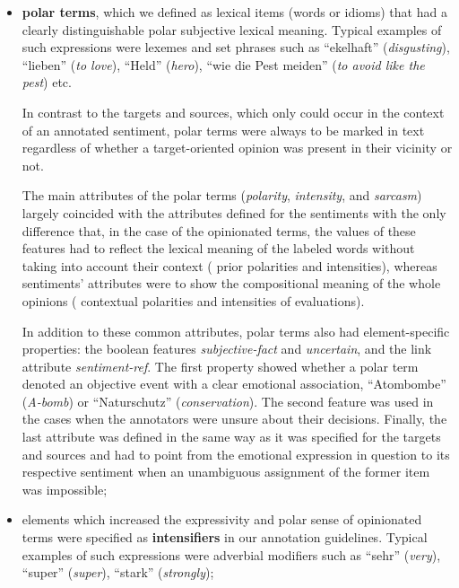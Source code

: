 \begin{itemize}
\item
  \textbf{polar terms}, which we defined as lexical items
  (words or idioms) that had a clearly distinguishable polar
  subjective lexical meaning.  Typical examples of such expressions
  were lexemes and set phrases such as ``ekelhaft''
  (\emph{disgusting}), ``lieben'' (\emph{to love}), ``Held''
  (\emph{hero}), ``wie die Pest meiden'' (\emph{to avoid like the
    pest}) etc.

  In contrast to the targets and sources, which only could occur in
  the context of an annotated sentiment, polar terms were
  always to be marked in text regardless of whether a target-oriented
  opinion was present in their vicinity or not.

  The main attributes of the polar terms (\emph{polarity},
  \emph{intensity}, and \emph{sarcasm}) largely coincided with the
  attributes defined for the sentiments with the only difference that,
  in the case of the opinionated terms, the values of these features
  had to reflect the lexical meaning of the labeled words without
  taking into account their context (\ie{} prior polarities and
  intensities), whereas sentiments' attributes were to show the
  compositional meaning of the whole opinions (\ie{} contextual
  polarities and intensities of evaluations).

  In addition to these common attributes, polar terms also
  had element-specific properties: the boolean features
  \emph{subjective-fact} and \emph{uncertain}, and the link attribute
  \emph{sentiment-ref}.  The first property showed whether a polar
  term denoted an objective event with a clear emotional association,
  \eg{} ``Atombombe'' (\emph{A-bomb}) or ``Naturschutz''
  (\emph{conservation}).  The second feature was used in the cases
  when the annotators were unsure about their decisions.  Finally, the
  last attribute was defined in the same way as it was specified for
  the targets and sources and had to point from the emotional
  expression in question to its respective sentiment when an
  unambiguous assignment of the former item was impossible;

\item
  elements which increased the expressivity and polar sense of
  opinionated terms were specified as \textbf{intensifiers} in our
  annotation guidelines.  Typical examples of such expressions were
  adverbial modifiers such as ``sehr'' (\emph{very}), ``super''
  (\emph{super}), ``stark'' (\emph{strongly});


\end{itemize}
